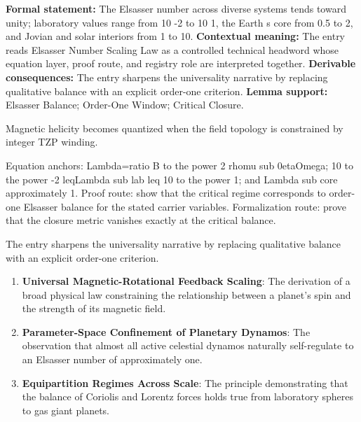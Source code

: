 \begingroup\footnotesize\setlength{\emergencystretch}{3em}\sloppy
\textbf{Formal statement:} The Elsasser number across diverse systems tends toward unity; laboratory values range from 10 -2 to 10 1, the Earth s core from 0.5 to 2, and Jovian and solar interiors from 1 to 10. \textbf{Contextual meaning:} The entry reads Elsasser Number Scaling Law as a controlled technical headword whose equation layer, proof route, and registry role are interpreted together. \textbf{Derivable consequences:} The entry sharpens the universality narrative by replacing qualitative balance with an explicit order-one criterion. \textbf{Lemma support:} Elsasser Balance; Order-One Window; Critical Closure.\par
\endgroup

Magnetic helicity becomes quantized when the field topology is constrained by integer TZP winding.

Equation anchors: Lambda=ratio B to the power 2 rhomu sub 0etaOmega; 10 to the power -2 leqLambda sub lab leq 10 to the power 1; and Lambda sub core approximately 1. Proof route: show that the critical regime corresponds to order-one Elsasser balance for the stated carrier variables. Formalization route: prove that the closure metric vanishes exactly at the critical balance.

The entry sharpens the universality narrative by replacing qualitative balance with an explicit order-one criterion.
\endgroup

\begin{enumerate}[leftmargin=1.6em,itemsep=6pt,topsep=4pt]
\item \textbf{Universal Magnetic-Rotational Feedback Scaling}: The derivation of a broad physical law constraining the relationship between a planet's spin and the strength of its magnetic field.
\item \textbf{Parameter-Space Confinement of Planetary Dynamos}: The observation that almost all active celestial dynamos naturally self-regulate to an Elsasser number of approximately one.
\item \textbf{Equipartition Regimes Across Scale}: The principle demonstrating that the balance of Coriolis and Lorentz forces holds true from laboratory spheres to gas giant planets.
\end{enumerate}

